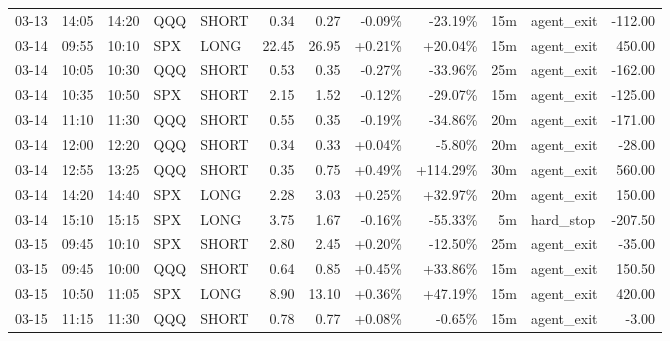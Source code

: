 \documentclass[11pt,a4paper]{article}
\begin{document}
\begin{center}
\begin{longtable}{>{\color{txtmain}}l l l l l r r r r r >{\color{txtmain}}l r}
03-13 & 14:05 & 14:20 & QQQ & SHORT & 0.34 & 0.27 & \textcolor{lossred}{-0.09\%} & \textcolor{lossred}{-23.19\%} & 15m & agent\_exit & \textcolor{lossred}{-112.00} \\
03-14 & 09:55 & 10:10 & SPX & LONG & 22.45 & 26.95 & \textcolor{wingreen}{+0.21\%} & \textcolor{wingreen}{+20.04\%} & 15m & agent\_exit & \textcolor{wingreen}{450.00} \\
03-14 & 10:05 & 10:30 & QQQ & SHORT & 0.53 & 0.35 & \textcolor{lossred}{-0.27\%} & \textcolor{lossred}{-33.96\%} & 25m & agent\_exit & \textcolor{lossred}{-162.00} \\
03-14 & 10:35 & 10:50 & SPX & SHORT & 2.15 & 1.52 & \textcolor{lossred}{-0.12\%} & \textcolor{lossred}{-29.07\%} & 15m & agent\_exit & \textcolor{lossred}{-125.00} \\
03-14 & 11:10 & 11:30 & QQQ & SHORT & 0.55 & 0.35 & \textcolor{lossred}{-0.19\%} & \textcolor{lossred}{-34.86\%} & 20m & agent\_exit & \textcolor{lossred}{-171.00} \\
03-14 & 12:00 & 12:20 & QQQ & SHORT & 0.34 & 0.33 & \textcolor{wingreen}{+0.04\%} & \textcolor{lossred}{-5.80\%} & 20m & agent\_exit & \textcolor{lossred}{-28.00} \\
03-14 & 12:55 & 13:25 & QQQ & SHORT & 0.35 & 0.75 & \textcolor{wingreen}{+0.49\%} & \textcolor{wingreen}{+114.29\%} & 30m & agent\_exit & \textcolor{wingreen}{560.00} \\
03-14 & 14:20 & 14:40 & SPX & LONG & 2.28 & 3.03 & \textcolor{wingreen}{+0.25\%} & \textcolor{wingreen}{+32.97\%} & 20m & agent\_exit & \textcolor{wingreen}{150.00} \\
03-14 & 15:10 & 15:15 & SPX & LONG & 3.75 & 1.67 & \textcolor{lossred}{-0.16\%} & \textcolor{lossred}{-55.33\%} & 5m & hard\_stop & \textcolor{lossred}{-207.50} \\
03-15 & 09:45 & 10:10 & SPX & SHORT & 2.80 & 2.45 & \textcolor{wingreen}{+0.20\%} & \textcolor{lossred}{-12.50\%} & 25m & agent\_exit & \textcolor{lossred}{-35.00} \\
03-15 & 09:45 & 10:00 & QQQ & SHORT & 0.64 & 0.85 & \textcolor{wingreen}{+0.45\%} & \textcolor{wingreen}{+33.86\%} & 15m & agent\_exit & \textcolor{wingreen}{150.50} \\
03-15 & 10:50 & 11:05 & SPX & LONG & 8.90 & 13.10 & \textcolor{wingreen}{+0.36\%} & \textcolor{wingreen}{+47.19\%} & 15m & agent\_exit & \textcolor{wingreen}{420.00} \\
03-15 & 11:15 & 11:30 & QQQ & SHORT & 0.78 & 0.77 & \textcolor{wingreen}{+0.08\%} & \textcolor{lossred}{-0.65\%} & 15m & agent\_exit & \textcolor{lossred}{-3.00} \\

\end{longtable}
\end{center}
\end{document}
